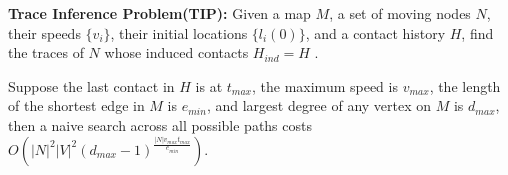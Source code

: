 \textbf{Trace Inference Problem(TIP):} Given a map $M$, a set of moving nodes $N$,
their speeds $\{v_i\}$, their initial locations $\{l_i(0)\}$, and a contact history $H$,
find the traces of $N$ whose induced contacts $H_{ind} = H$ .

Suppose the last contact in $H$ is at $t_{max}$, the maximum speed is $v_{max}$,
the length of the shortest edge in $M$ is
$e_{min}$, and largest degree of any vertex on $M$ is $d_{max}$, then
a naive search across all possible paths costs
$O\left(|N|^2|V|^2 (d_{max}-1)^ {\frac{|N| v_{max} t_{max}}{e_{min}}}\right)$.

